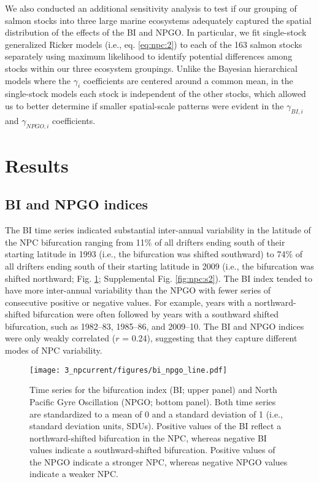 We also conducted an additional sensitivity analysis to test if our grouping of
salmon stocks into three large marine ecosystems adequately captured the spatial
distribution of the effects of the BI and NPGO. In particular, we fit
single-stock generalized Ricker models (i.e., eq. \ref{eq:npc:2}) to each of the
163 salmon stocks separately using maximum likelihood to identify potential
differences among stocks within our three ecosystem groupings. Unlike the
Bayesian hierarchical models where the \(\gamma_i\) coefficients are centered
around a common mean, in the single-stock models each stock is independent of
the other stocks, which allowed us to better determine if smaller spatial-scale
patterns were evident in the \(\gamma_{BI,i}\) and \(\gamma_{NPGO,i}\)
coefficients.



\section{Results}

\subsection{BI and NPGO indices}

The BI time series indicated substantial inter-annual variability in the
latitude of the NPC bifurcation ranging from 11\% of all drifters ending south
of their starting latitude in 1993 (i.e., the bifurcation was shifted southward)
to 74\% of all drifters ending south of their starting latitude in 2009 (i.e.,
the bifurcation was shifted northward; Fig. \ref{fig:npc:2}; Supplemental Fig.
\ref{fig:npc:s2}). The BI index tended to have more inter-annual variability than
the NPGO with fewer series of consecutive positive or negative values. For
example, years with a northward-shifted bifurcation were often followed by years
with a southward shifted bifurcation, such as 1982--83, 1985--86, and 2009--10.
The BI and NPGO indices were only weakly correlated (\(r\) = 0.24), suggesting
that they capture different modes of NPC variability.

\begin{figure}[htbp]
  \centering \texttt{[image: 3\_npcurrent/figures/bi\_npgo\_line.pdf]}
  \caption[Time series for the bifurcation index and North Pacific Gyre
           Oscillation]{Time series for the bifurcation index (BI; upper panel)
           and North Pacific Gyre Oscillation (NPGO; bottom panel). Both time
           series are standardized to a mean of 0 and a standard deviation of 1
           (i.e., standard deviation units, SDUs). Positive values of the BI
           reflect a northward-shifted bifurcation in the NPC, whereas negative
           BI values indicate a southward-shifted bifurcation. Positive values
           of the NPGO indicate a stronger NPC, whereas negative NPGO values
           indicate a weaker NPC.}
  \label{fig:npc:2}
\end{figure}


